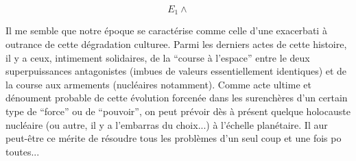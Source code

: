 
\[
 E_1\wedge
\]



Il me semble que notre époque se caractérise comme celle d'une exacerbati à outrance de cette dégradation culturee. Parmi les derniers actes de cette histoire, il y a ceux, intimement solidaires, de la ``course à l'espace'' entre le deux superpuissances antagonistes (imbues de valeurs essentiellement identiques) et de la course aux armements (nucléaires notamment). Comme acte ultime et dénoument probable de cette évolution forcenée dans les surenchères d'un certain type de ``force'' ou de ``pouvoir'', on peut prévoir dès à présent quelque holocauste nucléaire (ou autre, il y a l'embarras du choix...) à l'échelle planétaire. Il aur peut-être ce mérite de résoudre tous les problèmes d'un seul coup et une fois po toutes...

